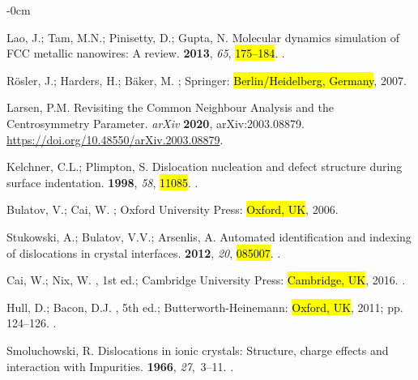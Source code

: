\documentclass[applsci,article,accept,pdftex,moreauthors]{Definitions/mdpi}
\newcommand{\?}{\stackrel{?}{=}}
\begin{document}
\begin{adjustwidth}{-\extralength}{0cm}
\begin{thebibliography}{999}
Lao, J.; Tam, M.N.; Pinisetty, D.; Gupta, N.
\newblock Molecular dynamics simulation of {FCC} metallic nanowires: A review.
  {\bf 2013}, {\em 65}, \hl{175--184}.
.

Rösler, J.; Harders, H.; Bäker, M.
; Springer:  \hl{Berlin/Heidelberg, Germany},  2007.

Larsen, P.M.
\newblock Revisiting the Common Neighbour Analysis and the Centrosymmetry
  Parameter. \emph{arXiv} \textbf{2020}, arXiv:2003.08879. \url{https://doi.org/10.48550/arXiv.2003.08879}.

Kelchner, C.L.; Plimpton, S.
\newblock Dislocation nucleation and defect structure during surface
  indentation.
 {\bf
  1998}, {\em 58}, \hl{11085}.
.

Bulatov, V.; Cai, W.
; Oxford University Press: \hl{Oxford, UK},
  2006.

Stukowski, A.; Bulatov, V.V.; Arsenlis, A.
\newblock Automated identification and indexing of dislocations in crystal
  interfaces.
  {\bf 2012}, {\em 20}, \hl{085007}.
.

Cai, W.; Nix, W.
, 1st ed.; Cambridge
  University Press: \hl{Cambridge, UK}, 2016.
.

Hull, D.; Bacon, D.J.
, 5th ed.; Butterworth-Heinemann: \hl{Oxford, UK},
  2011; pp. 124--126.
.

Smoluchowski, R.
\newblock Dislocations in ionic crystals: Structure, charge effects and
  interaction with Impurities.
 {\bf 1966}, {\em 27},~3--11.
.


\end{thebibliography}
\end{adjustwidth}
\end{document}

